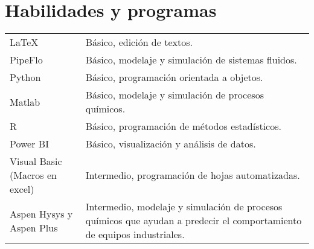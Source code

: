 \documentclass[a4paper,12pt]{article}
\begin{document}

\section{Habilidades y programas}
\begin{tabularx}{\linewidth}{@{}l X@{}}
\LaTeX &  \normalsize{Básico, edición de textos.}\\
PipeFlo &  \normalsize{Básico, modelaje y simulación de sistemas fluidos.}\\
Python &  \normalsize{Básico, programación orientada a objetos.}\\
Matlab &  \normalsize{Básico, modelaje y simulación de procesos químicos.}\\
R &  \normalsize{Básico, programación de métodos estadísticos.}\\
Power BI &  \normalsize{Básico, visualización y análisis de datos.}\\
Visual Basic (Macros en excel)  &  \normalsize{Intermedio, programación de hojas automatizadas.}\\ 
Aspen Hysys y Aspen Plus  &  \normalsize{Intermedio, modelaje y simulación de procesos químicos que ayudan a predecir el comportamiento de equipos industriales.}\\  
\end{tabularx}
\vfill
{}
\end{document}

